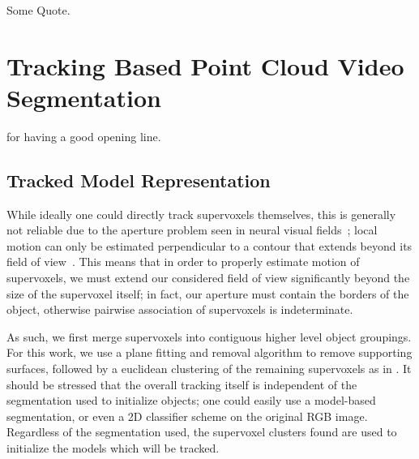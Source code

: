 \begin{savequote}[75mm]
Some Quote.
\end{savequote}


\chapter{Tracking Based Point Cloud Video Segmentation}
\label{Chap:TrackingBasedSegmentation}
 for having a good opening line. 

\section{Tracked Model Representation}
While ideally one could directly track supervoxels themselves, this is generally not reliable due to the aperture problem seen in neural visual fields~\cite{MarrApertureProblem}; local motion can only be estimated perpendicular to a contour that extends beyond its field of view~\cite{shimojo1989}. This means that in order to properly estimate motion of supervoxels, we must extend our considered field of view significantly beyond the size of the supervoxel itself; in fact, our aperture must contain the borders of the object, otherwise pairwise association of supervoxels is indeterminate. 

As such, we first merge supervoxels into contiguous higher level object groupings. For this work, we use a plane fitting and removal algorithm to remove supporting surfaces, followed by a euclidean clustering of the remaining supervoxels as in \cite{Radu3dIsHere}. It should be stressed that the overall tracking itself is independent of the segmentation used to initialize objects; one could easily use a model-based segmentation, or even a 2D classifier scheme on the original RGB image. Regardless of the segmentation used, the supervoxel clusters found are used to initialize the models which will be tracked.

